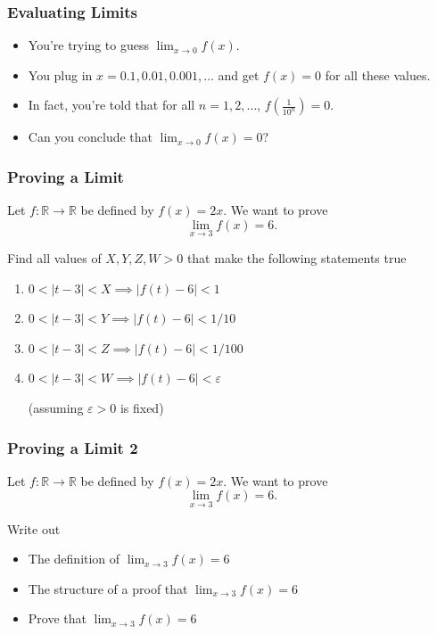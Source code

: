 \documentclass[14pt]{beamer}
\newcommand {\DS} [1] {${\displaystyle #1}$}
\newcommand{\p}{\pause}
\begin{document}
\begin{frame}
\frametitle{Evaluating Limits}

\begin{itemize}
	\item You're trying to guess $\displaystyle{\lim_{x \rightarrow 0}
f(x)}$. 

	\item You plug in $x=0.1, 0.01, 0.001, \dots$ and get $f(x)=0$ for
all these values. 

\item In fact, you're told that for all $n=1, 2, \dots$,
$\displaystyle{f\left(\frac{1}{10^n}\right)}=0$. \\

\item Can you conclude that \DS{\lim_{x \rightarrow 0}
f(x)=0}?
\end{itemize}

\end{frame}

\begin{frame}
\frametitle{Proving a Limit}

	Let $f:\mathbb R\to\mathbb R$ be defined by $f(x)=2x$. We want to prove
	\[
		\lim_{x\to 3} f(x)=6.
	\]

	\vfill
	Find all values of $X,Y,Z,W>0$ that make the following statements true
	\bigskip
	\begin{enumerate}
		\item $0<|t-3|<X\implies |f(t)-6|<1$
		\item $0<|t-3|<Y\implies |f(t)-6|<1/10$
		\item $0<|t-3|<Z\implies |f(t)-6|<1/100$
			\vfill
		\p
	\item $0<|t-3|<W\implies |f(t)-6|<\varepsilon$

		(assuming $\varepsilon>0$ is fixed)
	\end{enumerate} 

\end{frame}

\begin{frame}
\frametitle{Proving a Limit 2}

	Let $f:\mathbb R\to\mathbb R$ be defined by $f(x)=2x$. We want to prove
	\[
		\lim_{x\to 3} f(x)=6.
	\]

	\vfill
	Write out
	\begin{itemize}
		\item The definition of \DS{\lim_{x\to 3}f(x)=6}
		\item The structure of a proof that \DS{\lim_{x\to 3}f(x)=6}
		\vfill\p
		\item Prove that \DS{\lim_{x\to 3}f(x)=6}
	\end{itemize}

\end{frame}
\end{document}
